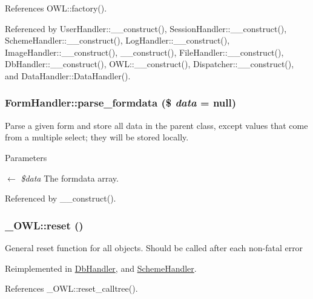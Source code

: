 References OWL::factory().



Referenced by UserHandler::\_\-\_\-construct(), SessionHandler::\_\-\_\-construct(), SchemeHandler::\_\-\_\-construct(), LogHandler::\_\-\_\-construct(), ImageHandler::\_\-\_\-construct(), \_\-\_\-construct(), FileHandler::\_\-\_\-construct(), DbHandler::\_\-\_\-construct(), OWL::\_\-\_\-construct(), Dispatcher::\_\-\_\-construct(), and DataHandler::DataHandler().

\subsubsection[{parse\_\-formdata}]{\setlength{\rightskip}{0pt plus 5cm}FormHandler::parse\_\-formdata (\$ {\em data} = {\ttfamily null})}\label{classFormHandler_aef73c198dbc5de4e84f6c2a23b8b294c}
Parse a given form and store all data in the parent class, except values that come from a multiple select; they will be stored locally.


\begin{DoxyParams}{Parameters}
\item[\mbox{$\leftarrow$} {\em \$data}]The formdata array. \end{DoxyParams}


Referenced by \_\-\_\-construct().

\subsubsection[{reset}]{\setlength{\rightskip}{0pt plus 5cm}\_\-OWL::reset ()}\label{class__OWL_a2f2a042bcf31965194c03033df0edc9b}
General reset function for all objects. Should be called after each non-\/fatal error 

Reimplemented in \hyperlink{classDbHandler_a9982df4830f05803935bb31bac7fae3d}{DbHandler}, and \hyperlink{classSchemeHandler_aa25feb4a70d67b3d571904be4b2f50bc}{SchemeHandler}.



References \_\-OWL::reset\_\-calltree().




